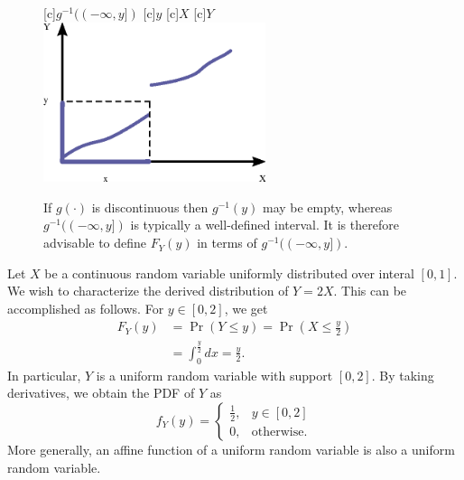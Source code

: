\begin{figure}[ht]
\begin{center}
\begin{psfrags}
[c]{$g^{-1} ((-\infty, y])$}
[c]{$y$}
[c]{$X$}
[c]{$Y$}
\includegraphics[width=6.5cm]{Figures/9Chapter/Discontinuous}
\end{psfrags}
\caption{If $g(\cdot)$ is discontinuous then $g^{-1} (y)$ may be empty, whereas $g^{-1} ((-\infty, y])$ is typically a well-defined interval.
It is therefore advisable to define $F_Y (y)$ in terms of $g^{-1} ((-\infty, y])$.}
\end{center}
\end{figure}

\begin{example}
Let $X$ be a continuous random variable uniformly distributed over interal $[0, 1]$.
We wish to characterize the derived distribution of $Y = 2X$.
This can be accomplished as follows.
For $y \in [0, 2]$, we get
\begin{equation*}
\begin{split}
F_Y(y) &= \Pr (Y \leq y) = \Pr \left( X \leq \frac{y}{2} \right) \\
&= \int_0^{\frac{y}{2}} dx = \frac{y}{2} .
\end{split}
\end{equation*}
In particular, $Y$ is a uniform random variable with support $[0, 2]$.
By taking derivatives, we obtain the PDF of $Y$ as
\begin{equation*}
f_Y(y) = \begin{cases} \frac{1}{2}, & y \in [0, 2] \\
0, & \text{otherwise}. \end{cases}
\end{equation*}
More generally, an affine function of a uniform random variable is also a uniform random variable.
\end{example}

